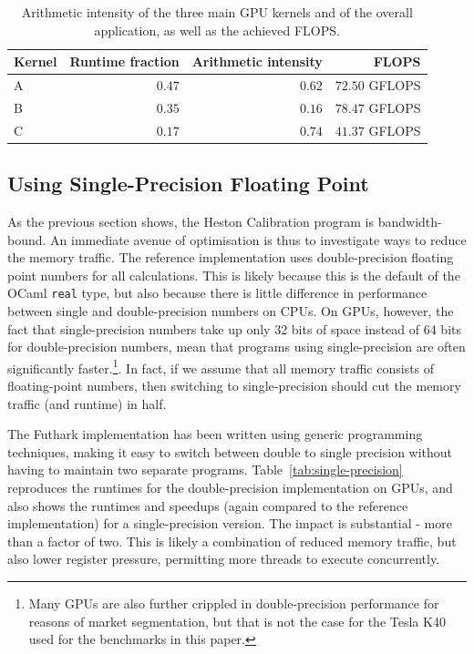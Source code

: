 \documentclass{article}
\begin{document}
\begin{table}
  \centering
  \begin{tabular}{l|r|r|r}
    \textbf{Kernel} & \textbf{Runtime fraction} & \textbf{Arithmetic intensity} & \textbf{FLOPS} \\\hline\hline
    A & $0.47$ & $0.62$ & $72.50$ GFLOPS \\
    B & $0.35$ & $0.16$ & $78.47$ GFLOPS \\
    C & $0.17$ & $0.74$ & $41.37$ GFLOPS \\
  \end{tabular}
  \caption{Arithmetic intensity of the three main GPU kernels and of
    the overall application, as well as the achieved FLOPS.}
  \label{tab:arithmetic-intensity}
\end{table}

\subsection{Using Single-Precision Floating Point}

As the previous section shows, the Heston Calibration program is
bandwidth-bound.  An immediate avenue of optimisation is thus to
investigate ways to reduce the memory traffic.  The reference
implementation uses double-precision floating point numbers for all
calculations.  This is likely because this is the default of the OCaml
\texttt{real} type, but also because there is little difference in
performance between single and double-precision numbers on CPUs.  On
GPUs, however, the fact that single-precision numbers take up only 32
bits of space instead of 64 bits for double-precision numbers, mean
that programs using single-precision are often significantly
faster.\footnote{Many GPUs are also further crippled in
  double-precision performance for reasons of market segmentation, but
  that is not the case for the Tesla K40 used for the benchmarks in
  this paper.}.  In fact, if we assume that all memory traffic
consists of floating-point numbers, then switching to single-precision
should cut the memory traffic (and runtime) in half.

The Futhark implementation has been written using generic programming
techniques, making it easy to switch between double to single
precision without having to maintain two separate programs.
Table~\ref{tab:single-precision} reproduces the runtimes for the
double-precision implementation on GPUs, and also shows the runtimes
and speedups (again compared to the reference implementation) for a
single-precision version.  The impact is substantial - more than a
factor of two.  This is likely a combination of reduced memory
traffic, but also lower register pressure, permitting more threads to
execute concurrently.
\end{document}
